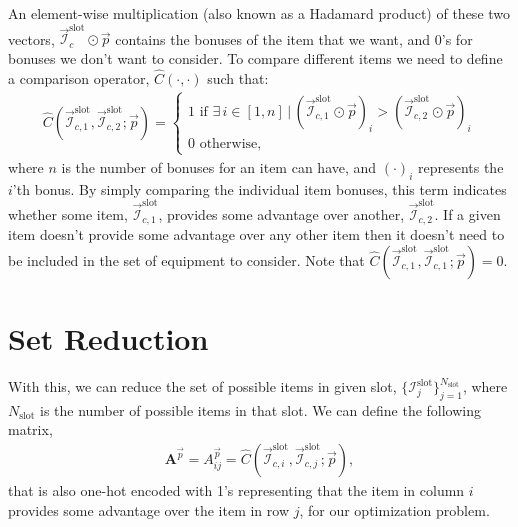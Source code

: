 	An element-wise multiplication (also known as a Hadamard product) of these two vectors, $\vec{\mathcal{I}}_c^\text{slot} \odot \vec{p}$ contains the bonuses of the item that we want, and 0's for bonuses we don't want to consider. To compare different items we need to define a comparison operator, $\hat C (\cdot, \cdot)$ such that:
	\begin{align}
	    \hat C (\vec{\mathcal{I}}_{c, 1}^\text{slot}, \vec{\mathcal{I}}_{c, 2}^\text{slot}; \vec{p}) = \begin{cases}
	        1 \text{ if $\exists\,i\in [1, n]\,|\,(\vec{\mathcal{I}}_{c, 1}^\text{slot}  \odot \vec p)_i > (\vec{\mathcal{I}}_{c, 2}^\text{slot}  \odot \vec p)_i$} \\
	        0 \text{ otherwise},
	    \end{cases}
	\end{align}
	where $n$ is the number of bonuses for an item can have, and $(\cdot)_i$ represents the $i$'th bonus.
	By simply comparing the individual item bonuses, this term indicates whether some item, $\vec{\mathcal{I}}_{c, 1}^\text{slot}$, provides some advantage over another, $\vec{\mathcal{I}}_{c, 2}^\text{slot}$. If a given item doesn't provide some advantage over any other item then it doesn't need to be included in the set of equipment to consider. Note that $\hat C (\vec{\mathcal{I}}_{c, 1}^\text{slot}, \vec{\mathcal{I}}_{c, 1}^\text{slot}; \vec{p}) = 0$.

\section{Set Reduction}
	With this, we can reduce the set of possible items in given slot, $\{\mathcal{I}^\text{slot}_j\}_{j=1}^{N_\text{slot}}$, where $N_\text{slot}$ is the number of possible items in that slot. We can define the following matrix,
	\begin{align}
	    \boldsymbol{A}^{\vec{p}} = A_{ij}^{\vec{p}} = \hat C (\vec{\mathcal{I}}_{c, i}^\text{slot}, \vec{\mathcal{I}}_{c, j}^\text{slot}; \vec{p}),
	\end{align}
	that is also one-hot encoded with 1's representing that the item in column $i$ provides some advantage over the item in row $j$, for our optimization problem.

